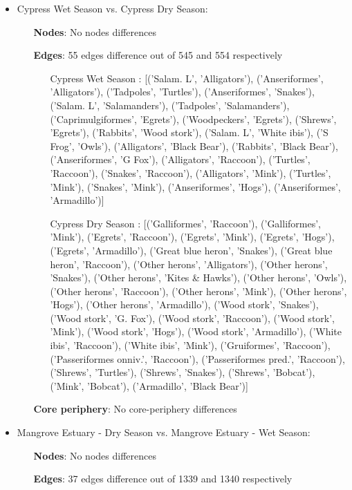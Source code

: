 \begin{itemize}
\item Cypress Wet Season vs. Cypress Dry Season:
	\begin{itemize}
	\item[\textbf{Nodes}:] No nodes differences
	\item[\textbf{Edges}:] 55 edges difference out of 545 and 554 respectively

		\begin{itemize}
			\item[Cypress Wet Season]: [('Salam. L', 'Alligators'), ('Anseriformes', 'Alligators'), ('Tadpoles', 'Turtles'), ('Anseriformes', 'Snakes'), ('Salam. L', 'Salamanders'), ('Tadpoles', 'Salamanders'), ('Caprimulgiformes', 'Egrets'), ('Woodpeckers', 'Egrets'), ('Shrews', 'Egrets'), ('Rabbits', 'Wood stork'), ('Salam. L', 'White ibis'), ('S Frog', 'Owls'), ('Alligators', 'Black Bear'), ('Rabbits', 'Black Bear'), ('Anseriformes', 'G Fox'), ('Alligators', 'Raccoon'), ('Turtles', 'Raccoon'), ('Snakes', 'Raccoon'), ('Alligators', 'Mink'), ('Turtles', 'Mink'), ('Snakes', 'Mink'), ('Anseriformes', 'Hogs'), ('Anseriformes', 'Armadillo')]
			\item[Cypress Dry Season]: [('Galliformes', 'Raccoon'), ('Galliformes', 'Mink'), ('Egrets', 'Raccoon'), ('Egrets', 'Mink'), ('Egrets', 'Hogs'), ('Egrets', 'Armadillo'), ('Great blue heron', 'Snakes'), ('Great blue heron', 'Raccoon'), ('Other herons', 'Alligators'), ('Other herons', 'Snakes'), ('Other herons', 'Kites & Hawks'), ('Other herons', 'Owls'), ('Other herons', 'Raccoon'), ('Other herons', 'Mink'), ('Other herons', 'Hogs'), ('Other herons', 'Armadillo'), ('Wood stork', 'Snakes'), ('Wood stork', 'G. Fox'), ('Wood stork', 'Raccoon'), ('Wood stork', 'Mink'), ('Wood stork', 'Hogs'), ('Wood stork', 'Armadillo'), ('White ibis', 'Raccoon'), ('White ibis', 'Mink'), ('Gruiformes', 'Raccoon'), ('Passeriformes onniv.', 'Raccoon'), ('Passeriformes pred.', 'Raccoon'), ('Shrews', 'Turtles'), ('Shrews', 'Snakes'), ('Shrews', 'Bobcat'), ('Mink', 'Bobcat'), ('Armadillo', 'Black Bear')]
		\end{itemize}
	\item[\textbf{Core periphery}:] No core-periphery differences

	\end{itemize}
\item Mangrove Estuary - Dry Season vs. Mangrove Estuary - Wet Season:
	\begin{itemize}
	\item[\textbf{Nodes}:] No nodes differences
	\item[\textbf{Edges}:] 37 edges difference out of 1339 and 1340 respectively


\end{itemize}
\end{itemize}
